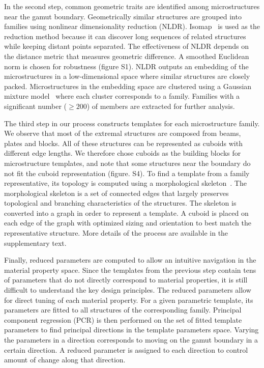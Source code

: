 In the second step, common geometric traits are identified among microstructures near the gamut boundary. Geometrically similar structures are grouped into families using nonlinear dimensionality reduction (NLDR). Isomap~\cite{tenenbaum2000global} is used as the reduction method because it can discover long sequences of related structures while keeping distant points separated. The effectiveness of NLDR depends on the distance metric that measures geometric difference. A smoothed Euclidean norm is chosen for robustness (figure S1). NLDR outputs an embedding of the microstructures in a low-dimensional space where similar structures are closely packed. Microstructures in the embedding space are clustered using a Gaussian mixture model~\cite{mclachlan2007algorithm} where each cluster corresponds to a family. Families with a significant number ($\geq 200$) of members are extracted for further analysis.

The third step in our process constructs templates for each microstructure family. We observe that most of the extremal structures are composed from beams, plates and blocks. All of these structures can be represented as cuboids with different edge lengths. We therefore chose cuboids as the building blocks for microstructure templates, and note that some structures near the boundary do not fit the cuboid representation (figure. S4).
To find a template from a family representative, its topology is computed using a morphological skeleton~\cite{Lee1994Skel}.
The morphological skeleton is a set of connected edges that largely preserves topological and branching characteristics of the structures. The skeleton is converted into a graph in order to represent a template. A cuboid is placed on each edge of the graph with optimized sizing and orientation to best match the representative structure. More details of the process are available in the supplementary text.

Finally, reduced parameters are computed to allow an intuitive navigation in the material property space. Since the templates from the previous step contain tens of parameters that do not directly correspond to material properties, it is still difficult to understand the key design principles. The reduced parameters allow for direct tuning of each material property. For a given parametric template, its parameters are fitted to all structures of the corresponding family. Principal component regression (PCR) is then performed on the set of fitted template parameters to find principal directions in the template parameters space. Varying the parameters in a direction corresponds to moving on the gamut boundary in a certain direction. A reduced parameter is assigned to each direction to control amount of change along that direction.